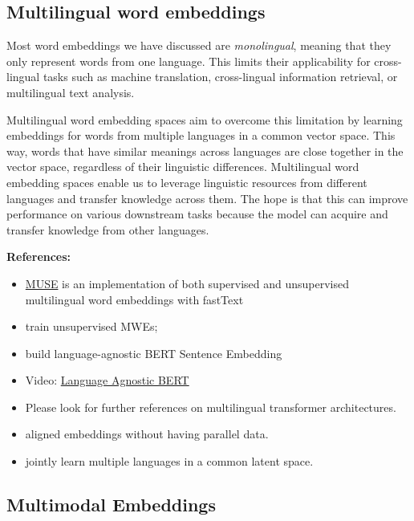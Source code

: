 \documentclass[11pt, a4paper]{amsart}
\begin{document}
\subsection{Multilingual word embeddings}

Most word embeddings we have discussed are \emph{monolingual}, meaning that they only represent words from one language.
This limits their applicability for cross-lingual tasks such as machine translation, cross-lingual information retrieval, or multilingual text analysis.

Multilingual word embedding spaces aim to overcome this limitation by learning embeddings for words from multiple languages in a common vector space. 
This way, words that have similar meanings across languages are close together in the vector space, regardless of their linguistic differences.
Multilingual word embedding spaces enable us to leverage linguistic resources from different languages and transfer knowledge across them.
The hope is that this can improve performance on various downstream tasks because the model can acquire and transfer knowledge from other languages.

\noindent \textbf{References:}
\begin{itemize}
	\item \href{https://github.com/facebookresearch/MUSE}{MUSE} is an implementation of both supervised and unsupervised multilingual word embeddings with fastText
	\item \cite{DBLP:journals/corr/abs-1808-08933} train unsupervised MWEs;
	\item \cite{DBLP:journals/corr/abs-2007-01852} build language-agnostic BERT Sentence Embedding
	\item Video: \href{https://youtu.be/7tAWk_Coj-s}{Language Agnostic BERT}
	\item Please look for further references on multilingual transformer architectures.
	\item \cite{DBLP:journals/corr/abs-1710-04087} aligned embeddings without having parallel data.
	\item \cite{10.1162/tacl_a_00257} jointly learn multiple languages in a common latent space.
\end{itemize}

\subsection{Multimodal Embeddings}
\end{document}
